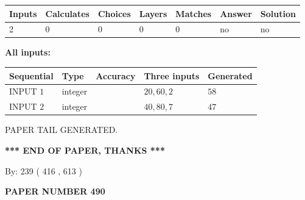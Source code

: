 \documentclass[12pt]{article}
\begin{document}
   
   
   
\noindent\begin{tabular}{|l|l|l|l|l|l|l|}
 \hline
Inputs & Calculates & Choices & Layers & Matches & Answer & Solution \\ \hline
 2  & 
 0  & 
 0
  & 
 0  & 
 0  & 
  no & 
  no 
  \\ \hline
 \end{tabular}
   
   
   
   
\noindent{}
   
   
   
   
\noindent\vspace{0.1in}\hspace{-0.08in} {\textbf{\Large{All inputs: }}}
   
   
  
  
\noindent\begin{tabular}{|l|l|l|l|l|}
\hline
 Sequential & Type & Accuracy & Three inputs & Generated \\ 
\hline
 
 
  INPUT $  1 $ & integer &  & $
 20
 , 
 60
 , 
 2
 $ & $ 58 $ 
 \\  \hline  
 
 
  INPUT $  2 $ & integer &  & $
 40
 , 
 80
 , 
 7
 $ & $ 47 $ 
 \\  \hline  
 \end{tabular}
   
   
   
   
   
   
 \vspace{0.2in}
 
   
   
\vspace{2.0in} PAPER TAIL GENERATED.
   
   
   
   
\vspace{1.0in} 
{\textbf{\large{ *** END OF PAPER, THANKS *** }}} 
   
   
\hspace{1.0in} By: 
 239 ( 416 ,  613 )
   
   
   
   
\newpage 
\setcounter{page}{ 
   490001 } 
   
   
   
   
 {\textbf{ \Large{ PAPER NUMBER  490  }}}
   
\end{document}
